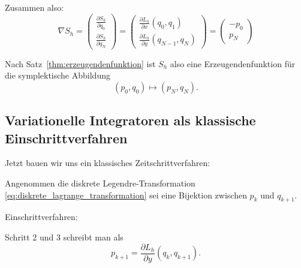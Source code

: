 \bigskip

Zusammen also:
\begin{equation*}
\nabla S_h = \begin{pmatrix}
\frac{\partial S_h}{\partial q_0} \\
\frac{\partial S_h}{\partial q_N}
\end{pmatrix} 
=
\begin{pmatrix}
\frac{\partial L_h}{\partial x} (q_0, q_1) \\
\frac{\partial L_h}{\partial y} (q_{N-1},q_N)
\end{pmatrix}
=
\begin{pmatrix}
- p_0 \\ p_N
\end{pmatrix}
\end{equation*}

Nach Satz~\ref{thm:erzeugendenfunktion} ist $S_h$ also eine Erzeugendenfunktion für die symplektische Abbildung
\begin{equation*}
(p_0, q_0) \mapsto (p_N, q_N).
\end{equation*} 

\subsection{Variationelle Integratoren als klassische Einschrittverfahren}

Jetzt bauen wir uns ein klassisches Zeitschrittverfahren:

\medskip

Angenommen die diskrete Legendre-Transformation \eqref{eq:diskrete_lagrange_transformation} sei eine Bijektion zwischen $p_k$ und $q_{k+1}$.

Einschrittverfahren:
\begin{center}
\end{center}
Schritt 2 und 3 schreibt man als
\begin{equation*}
p_{k+1} = \frac{\partial L_h}{\partial y} (q_k, q_{k+1}).
\end{equation*}

